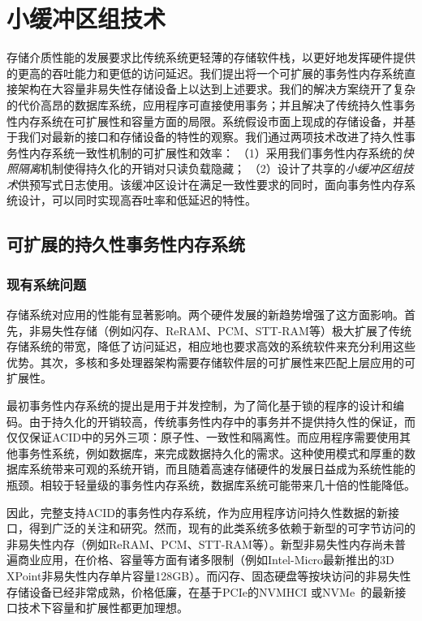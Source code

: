 \chapter{小缓冲区组技术}
\label{chap:sba}

存储介质性能的发展要求比传统系统更轻薄的存储软件栈，以更好地发挥硬件提供的更高的吞吐能力和更低的访问延迟。我们提出将一个可扩展的事务性内存系统直接架构在大容量非易失性存储设备上以达到上述要求。我们的解决方案绕开了复杂的代价高昂的数据库系统，应用程序可直接使用事务；并且解决了传统持久性事务性内存系统在可扩展性和容量方面的局限。系统假设市面上现成的存储设备，并基于我们对最新的接口和存储设备的特性的观察。我们通过两项技术改进了持久性事务性内存系统一致性机制的可扩展性和效率：
（1）采用我们事务性内存系统的\emph{快照隔离}机制使得持久化的开销对只读负载隐藏；
（2）设计了共享的\emph{小缓冲区组技术}供预写式日志使用。该缓冲区设计在满足一致性要求的同时，面向事务性内存系统设计，可以同时实现高吞吐率和低延迟的特性。

\section{可扩展的持久性事务性内存系统}

\subsection{现有系统问题}

存储系统对应用的性能有显著影响。两个硬件发展的新趋势增强了这方面影响。首先，非易失性存储（例如闪存\cite{Chen:2009:UIC:1555349.1555371, 4804997}、ReRAM\cite{6327378, 7168603}、PCM\cite{Loke22062012,6176872,Raoux:2008:PRA,10.1109/MM.2010.24}、STT-RAM\cite{4443191,6557176}等）极大扩展了传统存储系统的带宽，降低了访问延迟，相应地也要求高效的系统软件来充分利用这些优势。其次，多核和多处理器架构需要存储软件层的可扩展性来匹配上层应用的可扩展性\cite{Zheng:2014:FDF:2685048.2685085,Kimura:2015:FOE:2723372.2746480}。

最初事务性内存系统的提出是用于并发控制，为了简化基于锁的程序的设计和编码。由于持久化的开销较高，传统事务性内存中的事务并不提供持久性的保证，而仅仅保证ACID中的另外三项：原子性、一致性和隔离性。而应用程序需要使用其他事务性系统，例如数据库，来完成数据持久化的需求。这种使用模式和厚重的数据库系统带来可观的系统开销，而且随着高速存储硬件的发展日益成为系统性能的瓶颈。相较于轻量级的事务性内存系统，数据库系统可能带来几十倍的性能降低\cite{Volos:2011:MLP:1950365.1950379,
Coburn:2011:NMP:1950365.1950380}。

因此，完整支持ACID的事务性内存系统，作为应用程序访问持久性数据的新接口，得到广泛的关注和研究\cite{Volos:2011:MLP:1950365.1950379,
Coburn:2011:NMP:1950365.1950380, Zhao:2013:KCP:2540708.2540744, 6828760}。然而，现有的此类系统多依赖于新型的可字节访问的非易失性内存（例如ReRAM、PCM、STT-RAM等）。新型非易失性内存尚未普遍商业应用，在价格、容量等方面有诸多限制（例如Intel-Micro最新推出的3D XPoint非易失性内存单片容量128GB）。而闪存、固态硬盘等按块访问的非易失性存储设备已经非常成熟，价格低廉，在基于PCIe的NVMHCI 或NVMe~\cite{nvme}的最新接口技术下容量和扩展性都更加理想。

